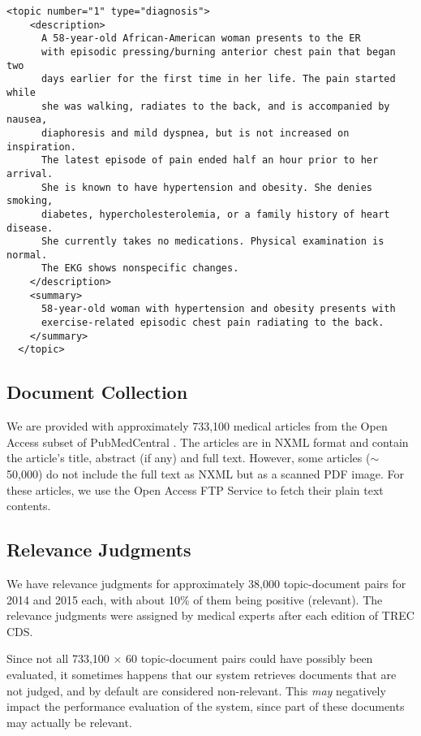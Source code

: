 \begin{Verbatim}[fontsize=\small]
  <topic number="1" type="diagnosis">
    <description>
      A 58-year-old African-American woman presents to the ER
      with episodic pressing/burning anterior chest pain that began two
      days earlier for the first time in her life. The pain started while
      she was walking, radiates to the back, and is accompanied by nausea,
      diaphoresis and mild dyspnea, but is not increased on inspiration.
      The latest episode of pain ended half an hour prior to her arrival.
      She is known to have hypertension and obesity. She denies smoking,
      diabetes, hypercholesterolemia, or a family history of heart disease.
      She currently takes no medications. Physical examination is normal.
      The EKG shows nonspecific changes.
    </description>
    <summary>
      58-year-old woman with hypertension and obesity presents with
      exercise-related episodic chest pain radiating to the back.
    </summary>
  </topic>
\end{Verbatim}

\subsection{Document Collection}
We are provided with approximately 733,100 medical articles from the Open Access subset of PubMedCentral \cite{oa}.
The articles are in NXML format
and contain the article's title, abstract (if any) and full text.
However, some articles ($\sim$ 50,000) do not include the full text
as NXML but as a scanned PDF image.
For these articles, we use the Open Access FTP Service \cite{oa-ftp} to fetch their plain text contents.

\subsection{Relevance Judgments}\label{qrels}
We have relevance judgments for approximately 38,000 topic-document pairs for 2014 and 2015 each, with about 10\% of them
being positive (relevant). The relevance judgments were assigned by medical experts after each edition of TREC CDS.

Since not all 733,100 $\times$ 60 topic-document pairs could have possibly been evaluated, it sometimes happens that our system retrieves documents
that are not judged, and by default are considered non-relevant. This \emph{may} negatively impact the performance evaluation of
the system, since part of these documents may actually be relevant.

